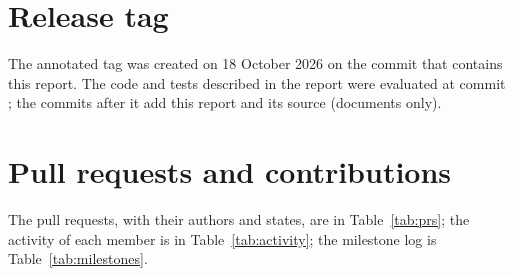 \section*{Release tag}
The annotated tag  was created on 18 October 2026 on the  commit that contains this report. The code and tests described in the report were evaluated at commit ; the commits after it add this report and its source (documents only).

\section*{Pull requests and contributions}
The pull requests, with their authors and states, are in Table~\ref{tab:prs}; the activity of each member is in Table~\ref{tab:activity}; the milestone log is Table~\ref{tab:milestones}.
